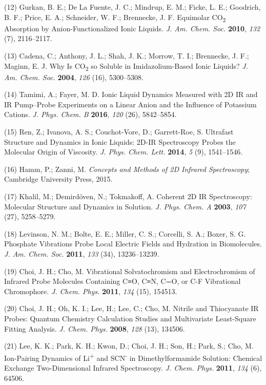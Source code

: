 \documentclass[]{article}
\begin{document}
(12) Gurkan, B. E.; De La Fuente, J. C.; Mindrup, E. M.; Ficke, L. E.;
Goodrich, B. F.; Price, E. A.; Schneider, W. F.; Brennecke, J. F.
Equimolar CO\textsubscript{2} Absorption by Anion-Functionalized Ionic
Liquids. \emph{J. Am. Chem. Soc.} \textbf{2010}, \emph{132} (7),
2116--2117.

(13) Cadena, C.; Anthony, J. L.; Shah, J. K.; Morrow, T. I.; Brennecke,
J. F.; Maginn, E. J. Why Is CO\textsubscript{2} so Soluble in
Imidazolium-Based Ionic Liquids? \emph{J. Am. Chem. Soc.} \textbf{2004},
\emph{126} (16), 5300--5308.

(14) Tamimi, A.; Fayer, M. D. Ionic Liquid Dynamics Measured with 2D IR
and IR Pump--Probe Experiments on a Linear Anion and the Influence of
Potassium Cations. \emph{J. Phys. Chem. B} \textbf{2016}, \emph{120}
(26), 5842--5854.

(15) Ren, Z.; Ivanova, A. S.; Couchot-Vore, D.; Garrett-Roe, S.
Ultrafast Structure and Dynamics in Ionic Liquids: 2D-IR Spectroscopy
Probes the Molecular Origin of Viscosity. \emph{J. Phys. Chem. Lett.}
\textbf{2014}, \emph{5} (9), 1541--1546.

(16) Hamm, P.; Zanni, M. \emph{Concepts and Methods of 2D Infrared
Spectroscopy}; Cambridge University Press, 2015.

(17) Khalil, M.; Demirdöven, N.; Tokmakoff, A. Coherent 2D IR
Spectroscopy: Molecular Structure and Dynamics in Solution. \emph{J.
Phys. Chem. A} \textbf{2003}, \emph{107} (27), 5258--5279.

(18) Levinson, N. M.; Bolte, E. E.; Miller, C. S.; Corcelli, S. A.;
Boxer, S. G. Phosphate Vibrations Probe Local Electric Fields and
Hydration in Biomolecules. \emph{J. Am. Chem. Soc.} \textbf{2011},
\emph{133} (34), 13236--13239.

(19) Choi, J. H.; Cho, M. Vibrational Solvatochromism and
Electrochromism of Infrared Probe Molecules Containing C≡O, C≡N, C=O, or
C-F Vibrational Chromophore. \emph{J. Chem. Phys.} \textbf{2011},
\emph{134} (15), 154513.

(20) Choi, J. H.; Oh, K. I.; Lee, H.; Lee, C.; Cho, M. Nitrile and
Thiocyanate IR Probes: Quantum Chemistry Calculation Studies and
Multivariate Least-Square Fitting Analysis. \emph{J. Chem. Phys.}
\textbf{2008}, \emph{128} (13), 134506.

(21) Lee, K. K.; Park, K. H.; Kwon, D.; Choi, J. H.; Son, H.; Park, S.;
Cho, M. Ion-Pairing Dynamics of Li\textsuperscript{+} and
SCN\textsuperscript{-} in Dimethylformamide Solution: Chemical Exchange
Two-Dimensional Infrared Spectroscopy. \emph{J. Chem. Phys.}
\textbf{2011}, \emph{134} (6), 64506.
\end{document}
